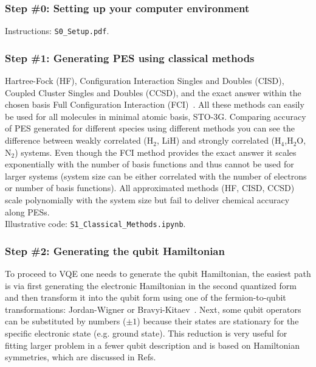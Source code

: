 \documentclass[12pt]{article}
\begin{document}
\subsubsection*{Step \#0: Setting up your computer environment}

Instructions: \texttt{S0\_Setup.pdf}.

\subsubsection*{Step \#1: Generating PES using classical methods}

Hartree-Fock (HF), Configuration Interaction Singles and Doubles (CISD), 
Coupled Cluster Singles and Doubles (CCSD), and the exact answer within the chosen basis Full Configuration Interaction (FCI)~\cite{Helgaker}.  
All these methods can easily be used for all molecules in minimal atomic basis, STO-3G. 
Comparing accuracy of PES generated for different species using different methods 
you can see the difference between weakly correlated (H$_2$, LiH) 
and strongly correlated (H$_4$,H$_2$O, N$_2$) systems. Even though the FCI method provides the exact answer it 
scales exponentially with the number of basis functions and thus cannot be used for larger systems (system size can be either correlated 
with the number of electrons or number of basis functions). All approximated methods (HF, CISD, CCSD) scale polynomially with the system 
size but fail to deliver chemical accuracy along PESs.\\

Illustrative code: \texttt{S1\_Classical\_Methods.ipynb}.

\subsubsection*{Step \#2: Generating the qubit Hamiltonian}

To proceed to VQE one needs to generate the qubit Hamiltonian, the easiest path is via first 
generating the electronic Hamiltonian in the second quantized form and then transform it into the qubit form using one of 
the fermion-to-qubit transformations: Jordan-Wigner or Bravyi-Kitaev~\cite{Seeley:2012/jcp/224109}. 
Next, some qubit operators can be substituted by numbers ($\pm 1$)
because their states are stationary for the specific electronic state (e.g. ground state). This reduction is very useful for fitting larger problem in 
a fewer qubit description and is based on Hamiltonian symmetries, which are discussed in Refs.~\cite{Bravyi:2017wba,Yen:2019bs,Setia:2019uz} \\
\end{document}
